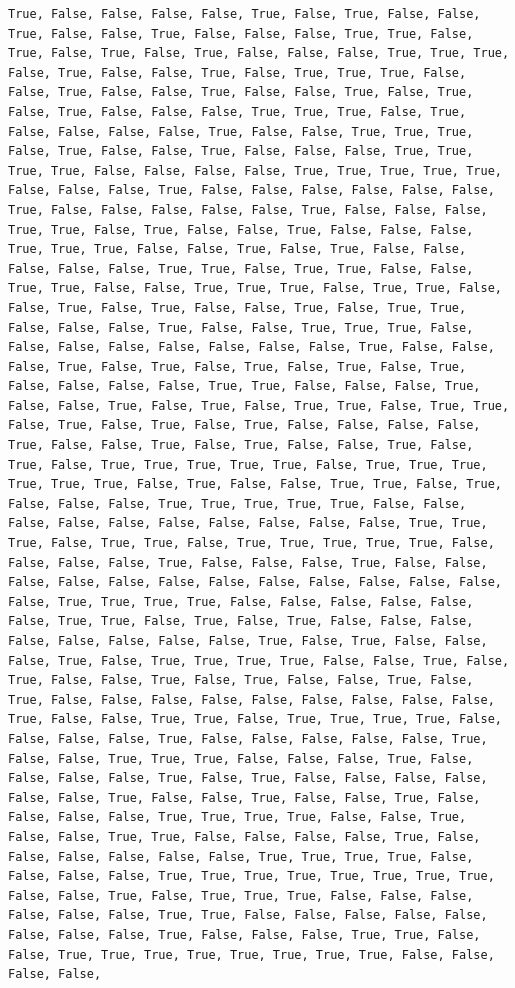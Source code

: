 \documentclass[
  letterpaper,
  DIV=11,
  numbers=noendperiod]{scrartcl}
\begin{document}
\begin{verbatim}
True, False, False, False, False, True, False, True, False, False, True, False, False, True, False, False, False, True, True, False, True, False, True, False, True, False, False, False, True, True, True, False, True, False, False, True, False, True, True, True, False, False, True, False, False, True, False, False, True, False, True, False, True, False, False, False, True, True, True, False, True, False, False, False, False, True, False, False, True, True, True, False, True, False, False, True, False, False, False, True, True, True, True, False, False, False, False, True, True, True, True, True, False, False, False, True, False, False, False, False, False, False, True, False, False, False, False, False, True, False, False, False, True, True, False, True, False, False, True, False, False, False, True, True, True, False, False, True, False, True, False, False, False, False, False, True, True, False, True, True, False, False, True, True, False, False, True, True, True, False, True, True, False, False, True, False, True, False, False, True, False, True, True, False, False, False, True, False, False, True, True, True, False, False, False, False, False, False, False, False, True, False, False, False, True, False, True, False, True, False, True, False, True, False, False, False, False, True, True, False, False, False, True, False, False, True, False, True, False, True, True, False, True, True, False, True, False, True, False, True, False, False, False, False, True, False, False, True, False, True, False, False, True, False, True, False, True, True, True, True, True, False, True, True, True, True, True, True, False, True, False, False, True, True, False, True, False, False, False, True, True, True, True, True, False, False, False, False, False, False, False, False, False, False, True, True, True, False, True, True, False, True, True, True, True, True, False, False, False, False, True, False, False, False, True, False, False, False, False, False, False, False, False, False, False, False, False, False, True, True, True, True, False, False, False, False, False, False, True, True, False, True, False, True, False, False, False, False, False, False, False, False, True, False, True, False, False, False, True, False, True, True, True, True, False, False, True, False, True, False, False, True, False, True, False, False, True, False, True, False, False, False, False, False, False, False, False, False, True, False, False, True, True, False, True, True, True, True, False, False, False, False, True, False, False, False, False, False, True, False, False, True, True, True, False, False, False, True, False, False, False, False, True, False, True, False, False, False, False, False, False, True, False, False, True, False, False, True, False, False, False, False, True, True, True, True, False, False, True, False, False, True, True, False, False, False, False, True, False, False, False, False, False, False, True, True, True, True, False, False, False, False, True, True, True, True, True, True, True, True, False, False, True, False, True, True, True, False, False, False, False, False, False, True, True, False, False, False, False, False, False, False, False, True, False, False, False, True, True, False, False, True, True, True, True, True, True, True, True, False, False, False, False, 
\end{verbatim}
\end{document}
